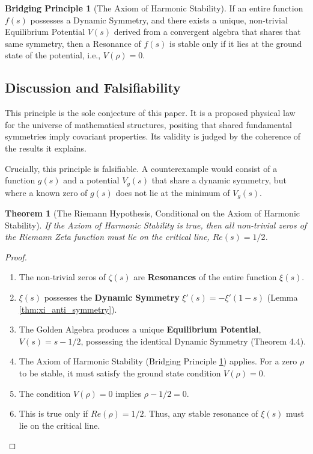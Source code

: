 \documentclass{article}
\theoremstyle{plain}
\newtheorem{theorem}{Theorem}[section]
\theoremstyle{definition}
\newtheorem{conjecture}{Bridging Principle}
\theoremstyle{remark}
\begin{document}
\begin{conjecture}[The Axiom of Harmonic Stability]
\label{conj:stability}
If an entire function $f(s)$ possesses a Dynamic Symmetry, and there exists a unique, non-trivial Equilibrium Potential $V(s)$ derived from a convergent algebra that shares that same symmetry, then a Resonance of $f(s)$ is stable only if it lies at the ground state of the potential, i.e., $V(\rho)=0$.
\end{conjecture}

\subsection{Discussion and Falsifiability}
This principle is the sole conjecture of this paper. It is a proposed physical law for the universe of mathematical structures, positing that shared fundamental symmetries imply covariant properties. Its validity is judged by the coherence of the results it explains.

Crucially, this principle is falsifiable. A counterexample would consist of a function $g(s)$ and a potential $V_g(s)$ that share a dynamic symmetry, but where a known zero of $g(s)$ does not lie at the minimum of $V_g(s)$.

\begin{theorem}[The Riemann Hypothesis, Conditional on the Axiom of Harmonic Stability]
If the Axiom of Harmonic Stability is true, then all non-trivial zeros of the Riemann Zeta function must lie on the critical line, $Re(s)=1/2$.
\end{theorem}
\begin{proof}
\begin{enumerate}
    \item The non-trivial zeros of $\zeta(s)$ are \textbf{Resonances} of the entire function $\xi(s)$.
    \item $\xi(s)$ possesses the \textbf{Dynamic Symmetry} $\xi'(s) = -\xi'(1-s)$ (Lemma \ref{thm:xi_anti_symmetry}).
    \item The Golden Algebra produces a unique \textbf{Equilibrium Potential}, $V(s) = s - 1/2$, possessing the identical Dynamic Symmetry (Theorem 4.4).
    \item The Axiom of Harmonic Stability (Bridging Principle \ref{conj:stability}) applies. For a zero $\rho$ to be stable, it must satisfy the ground state condition $V(\rho)=0$.
    \item The condition $V(\rho)=0$ implies $\rho - 1/2 = 0$.
    \item This is true only if $Re(\rho) = 1/2$. Thus, any stable resonance of $\xi(s)$ must lie on the critical line.
\end{enumerate}
\end{proof}
\end{document}
